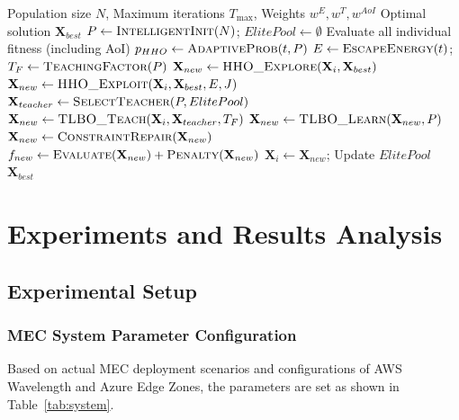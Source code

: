 \documentclass[conference]{IEEEtran}
\begin{document}
\begin{algorithm}[!t]
  \small
  \caption{TLBO-HHO Two-Phase Integration Algorithm (with AoI Optimization)}
  \label{alg:tlbo_hho_aoi}
  \begin{algorithmic}[1]
    \REQUIRE Population size $N$, Maximum iterations $T_{\max}$, Weights $w^E, w^T, w^{AoI}$
    \ENSURE Optimal solution $\mathbf{X}_{best}$
    \STATE $P \leftarrow \textsc{IntelligentInit}(N)$; $ElitePool \leftarrow \emptyset$
    \STATE Evaluate all individual fitness (including AoI)
        \STATE $p_{HHO} \leftarrow \textsc{AdaptiveProb}(t, P)$
        \STATE $E \leftarrow \textsc{EscapeEnergy}(t)$; $T_F \leftarrow \textsc{TeachingFactor}(P)$
                    \STATE $\mathbf{X}_{new} \leftarrow \textsc{HHO\_Explore}(\mathbf{X}_i, \mathbf{X}_{best})$
                \ELSE
                    \STATE $\mathbf{X}_{new} \leftarrow \textsc{HHO\_Exploit}(\mathbf{X}_i, \mathbf{X}_{best}, E, J)$
                \ENDIF
            \ELSE
                \STATE $\mathbf{X}_{teacher} \leftarrow \textsc{SelectTeacher}(P, ElitePool)$
                \STATE $\mathbf{X}_{new} \leftarrow \textsc{TLBO\_Teach}(\mathbf{X}_i, \mathbf{X}_{teacher}, T_F)$
                \STATE $\mathbf{X}_{new} \leftarrow \textsc{TLBO\_Learn}(\mathbf{X}_{new}, P)$
            \ENDIF
            \STATE $\mathbf{X}_{new} \leftarrow \textsc{ConstraintRepair}(\mathbf{X}_{new})$
            \STATE $f_{new} \leftarrow \textsc{Evaluate}(\mathbf{X}_{new}) + \textsc{Penalty}(\mathbf{X}_{new})$
                \STATE $\mathbf{X}_i \leftarrow \mathbf{X}_{new}$; Update $ElitePool$
            \ENDIF
        \ENDFOR
    \ENDFOR
    \RETURN $\mathbf{X}_{best}$
  \end{algorithmic}
\end{algorithm}

\section{Experiments and Results Analysis}
\subsection{Experimental Setup}
\subsubsection{MEC System Parameter Configuration}
Based on actual MEC deployment scenarios and configurations of AWS Wavelength and Azure Edge Zones, the parameters are set as shown in Table~\ref{tab:system}.
\end{document}
